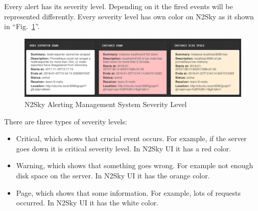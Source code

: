 Every alert has its severity level. Depending on it the fired events will be represented differently. Every severity level has own color on N2Sky as it shown in ``Fig.~\ref{fig:alert_severity}''.

\begin{figure}[htbp]
\begin{center}
  \includegraphics[width=\linewidth]{components/3/alerts/alert_severity.png}
  \caption{N2Sky Alerting Management System Severity Level}
  \label{fig:alert_severity}
\end{center}
\end{figure}

There are three types of severity levels:
\begin{itemize}
\item Critical, which shows that crucial event occurs. For example, if the server goes down it is critical severity level.  In N2Sky UI it has a red color. 
\item Warning, which shows that something goes wrong. For example not enough disk space on the server. In N2Sky UI it has the orange color. 
\item Page, which shows that some information. For example, lots of requests occurred. In N2Sky UI it has the white color.  
\end{itemize}
 



